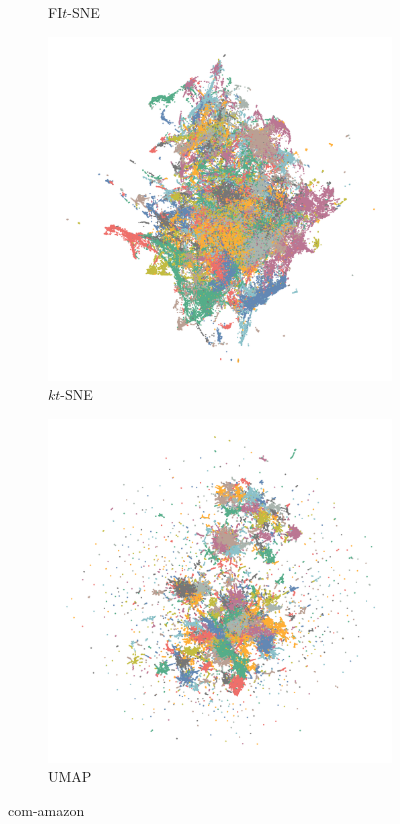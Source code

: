 \begin{appendix}
\begin{figure}[tbp]
\begin{subfigure}{0.45\linewidth}
    \caption{FI$t$-SNE}
\end{subfigure}
\par\bigskip
\begin{subfigure}{0.45\linewidth}
  \centering
    \includegraphics[width=\linewidth]{img/emb/ktsne_com-amazon}
    \caption{$kt$-SNE}
\end{subfigure}
  \begin{subfigure}{0.45\linewidth}
    \centering
    \includegraphics[width=\linewidth]{img/emb/umap_com-amazon}
    \caption{UMAP}
  \end{subfigure}
  \caption{com-amazon}
\end{figure}


\end{appendix}
